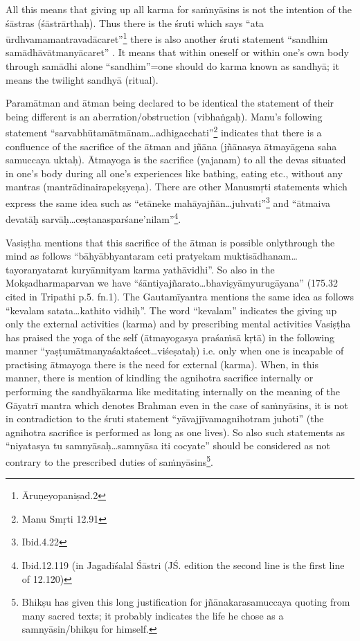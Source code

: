 All this means that giving up all karma for saṁnyāsins is not the intention of the śāstras (śāstrārthaḥ). Thus there is the śruti which says “ata ūrdhvamamantravadācaret”\footnote{Āruṇeyopaniṣad.2}   there is also another śruti statement “sandhim samādhāvātmanyācaret” . It means that within oneself or within one’s own body through samādhi alone “sandhim”=one should do karma known as sandhyā; it means the twilight sandhyā (ritual). 

Paramātman and ātman being declared to be identical the statement of their being different is an aberration/obstruction (vibhaṅgaḥ). Manu’s following statement “sarvabhūtamātmānam…adhigacchati”\footnote{Manu Smṛti 12.91} indicates that there is a confluence of the sacrifice of the ātman and jñāna (jñānasya ātmayāgena saha samuccaya uktaḥ). Ātmayoga is the sacrifice (yajanam) to all the devas situated in one’s body during all one’s experiences like bathing, eating etc., without any mantras (mantrādinairapekṣyeṇa). There are other Manusmṛti statements which express the same idea such as “etāneke mahāyajñān…juhvati”\footnote{Ibid.4.22} and “ātmaiva devatāḥ sarvāḥ…ceṣtanasparśane’nilam”\footnote{Ibid.12.119  (in Jagadīśalal Śāstri (JŚ. edition the second line is the first line of 12.120)}.

Vasiṣṭha mentions that this sacrifice of the ātman is possible only\break through the mind as follows “bāhyābhyantaram ceti pratyekam mukti\-sādhanam…\-tayoranyatarat kuryānnityam karma yathāvidhi”. So also in the Mokṣadharmaparvan we have “śāntiyajñarato…bhaviṣyāmyuru\-gāyana” (175.32 cited in Tripathi p.5. fn.1).  The Gautamīyantra mentions the same idea as follows “kevalam satata…kathito vidhiḥ”. The word “kevalam” indicates the giving up only the external activities (karma) and by prescribing mental activities Vasiṣṭha has praised the yoga of the self (ātmayogasya praśaṁsā kṛtā) in the following manner “yaṣṭumātmanyaśaktaścet…viśeṣataḥ) i.e. only when one is incapable of practising ātmayoga there is the need for external (karma). When, in this manner, there is mention of kindling the agnihotra sacrifice internally or performing the sandhyākarma like meditating internally on the meaning of the Gāyatrī mantra which denotes Brahman even in the case of saṁnyāsins, it is not in contradiction to the śruti statement “yāvajjīvamagnihotram juhoti” (the agnihotra sacrifice is performed as long as one lives). So also such statements as “niyatasya tu samnyāsaḥ…samnyāsa iti cocyate” should be considered as not contrary to the prescribed duties of saṁnyāsins\footnote{Bhikṣu has given this long justification for jñānakarasamuccaya quoting from many sacred texts; it probably indicates the life he chose as a samnyāsin/bhikṣu for himself.}.


